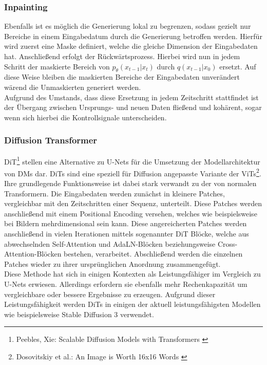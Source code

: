 \subsubsection{Inpainting}

Ebenfalls ist es möglich die Generierung lokal zu begrenzen, sodass gezielt nur Bereiche in einem Eingabedatum durch die Generierung betroffen werden. Hierfür wird zuerst eine Maske definiert, welche die gleiche Dimension der Eingabedaten hat. Anschließend erfolgt der Rückwärtsprozess. Hierbei wird nun in jedem Schritt der maskierte Bereich von $p_\theta(x_{t-1} | x_{t})$ durch $q(x_{t-1}|x_0)$ ersetzt. Auf diese Weise bleiben die maskierten Bereiche der Eingabedaten unverändert wärend die Unmaskierten generiert werden. \\
Aufgrund des Umstands, dass diese Ersetzung in jedem Zeitschritt stattfindet ist der Übergang zwischen Ursprungs- und neuen Daten fließend und kohärent, sogar wenn sich hierbei die Kontrollsignale unterscheiden.

\subsubsection{Diffusion Transformer}
\label{subsubsec:DiT}

\ac{DiT}\footnote{
    Peebles, Xie: Scalable Diffusion Models with Transformers
    \cite{peebles2023scalable}
} stellen eine Alternative zu U-Nets für die Umsetzung der Modellarchitektur von \ac{DM}s dar. \ac{DiT}s sind eine speziell für Diffusion angepasste Variante der \ac{ViT}s\footnote{
    Dosovitskiy et al.: An Image is Worth 16x16 Words 
    \cite{dosovitskiy2021imageworth16x16words}
}.\\
Ihre grundlegende Funktionsweise ist dabei stark verwandt zu der von normalen Transformern. Die Eingabedaten werden zunächst in kleinere Patches, vergleichbar mit den Zeitschritten einer Sequenz, unterteilt. Diese Patches werden anschließend mit einem Positional Encoding versehen, welches wie beispielsweise bei Bildern mehrdimensional sein kann. Diese angereicherten Patches werden anschließend in vielen Iterationen mittels sogenannter \ac{DiT} Blöcke, welche aus abwechselnden Self-Attention und \ac{AdaLN}-Blöcken beziehungsweise Cross-Attention-Blöcken bestehen, verarbeitet. Abschließend werden die einzelnen Patches wieder zu ihrer ursprünglichen Anordnung zusammengefügt. \\
Diese Methode hat sich in einigen Kontexten als Leistungsfähiger im Vergleich zu U-Nets erwiesen. Allerdings erfordern sie ebenfalls mehr Rechenkapazität um vergleichbare oder bessere Ergebnisse zu erzeugen. Aufgrund dieser Leistungsfähigkeit werden \ac{DiT}s in einigen der aktuell leistungsfähigsten Modellen wie beispielsweise Stable Diffusion 3 verwendet.

